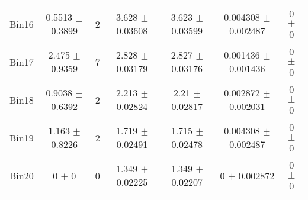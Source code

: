 \begin{tabular}{@{\extracolsep{4pt}}lcccccc@{}}
     Bin16 & 0.5513 $\pm$ 0.3899 & 2 & 3.628 $\pm$ 0.03608 & 3.623 $\pm$ 0.03599 & 0.004308 $\pm$ 0.002487 & 0 $\pm$ 0 \\ 
     Bin17 & 2.475 $\pm$ 0.9359 & 7 & 2.828 $\pm$ 0.03179 & 2.827 $\pm$ 0.03176 & 0.001436 $\pm$ 0.001436 & 0 $\pm$ 0 \\ 
     Bin18 & 0.9038 $\pm$ 0.6392 & 2 & 2.213 $\pm$ 0.02824 & 2.21 $\pm$ 0.02817 & 0.002872 $\pm$ 0.002031 & 0 $\pm$ 0 \\ 
     Bin19 & 1.163 $\pm$ 0.8226 & 2 & 1.719 $\pm$ 0.02491 & 1.715 $\pm$ 0.02478 & 0.004308 $\pm$ 0.002487 & 0 $\pm$ 0 \\ 
     Bin20 & 0 $\pm$ 0 & 0 & 1.349 $\pm$ 0.02225 & 1.349 $\pm$ 0.02207 & 0 $\pm$ 0.002872 & 0 $\pm$ 0 \\ 
\hline\hline
  \end{tabular}
